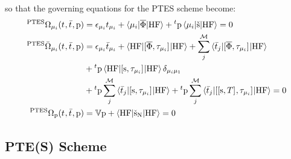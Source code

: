 so that the governing equations for the \acrshort{PTES} scheme become:
\begin{subequations}
  \begin{align}
   {}^{\mathrm{PTES}}\Omega_{\mu_i}(t_{}, \bar{t}_{}, \mathrm{p})  &=
   \epsilon_{\mu_i}t_{\mu_i} + \braket{\mu_i | \overline{\Phi} | \mathrm{HF}}
   + {}^t\mathrm{p}\braket{\mu_i | \check{\mathrm{s}} | \mathrm{HF}}
             = 0 \label{eq:ptes-cc-amplitudes}\\
   {}^{\mathrm{PTES}}\bar{\Omega}_{\mu_i}(t_{}, \bar{t}_{}, \mathrm{p})
    &=
    \epsilon_{\mu_i}\bar{t}_{\mu_i} +
    \braket{\mathrm{HF} | [ \overline{\Phi}, \tau_{\mu_i} ]^{} | \mathrm{HF}} +
    \sum_{j}^{\mathcal{M}}\braket{\bar{t}_{j} |
    [ \overline{\Phi}, \tau_{\mu_i} ]^{} | \mathrm{HF}}
    \nonumber \\
    &+
    {}^t\mathrm{p}\braket{\mathrm{HF} | [ \mathrm{s}, \tau_{\mu_i} ]^{} | \mathrm{HF}}\delta_{\mu_i\mu_1} \nonumber \\
    &+
    {}^t\mathrm{p}\sum_{j}^{\mathcal{M}}\braket{\bar{t}_{j} | [ \mathrm{s}, \tau_{\mu_i} ]^{} | \mathrm{HF}}
    +
    {}^t\mathrm{p}\sum_{j}^{\mathcal{M}}\braket{\bar{t}_{j} | [ [ \mathrm{s}, T ]^{}, \tau_{\mu_i} ]^{} | \mathrm{HF}}
             = 0 \label{eq:ptes-cc-multipliers}\\
    {}^{\mathrm{PTES}}\Omega_{\mathrm{p}}(t_{}, \bar{t}_{}, \mathrm{p})
    &=
    \mathbb{V}\mathrm{p} + \braket{\mathrm{HF} | \check{\mathrm{s}}_{\mathrm{N}} | \mathrm{HF}} = 0
    \label{eq:ptes-cc-polarization}
  \end{align}
\end{subequations}


\subsection*{PTE(S) Scheme}

